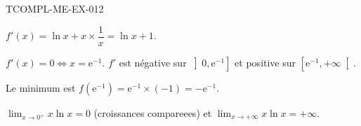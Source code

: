 \begin{corrige}{TCOMPL-ME-EX-012}

$f'(x) = \ln x + x \times \dfrac{1}{x} = \ln x + 1$.


$f'(x) = 0 \iff x = \mathrm{e}^{-1}$. $f'$ est négative sur $\left]0, \mathrm{e}^{-1}\right]$ et positive sur $\left[\mathrm{e}^{-1}, +\infty\right[$.

Le minimum est $f(\mathrm{e}^{-1}) = \mathrm{e}^{-1} \times (-1) = -\mathrm{e}^{-1}$.

$\lim_{x \to 0^+} x\ln x = 0$ (croissances compareees) et $\lim_{x \to +\infty} x\ln x = +\infty$.

\end{corrige}
